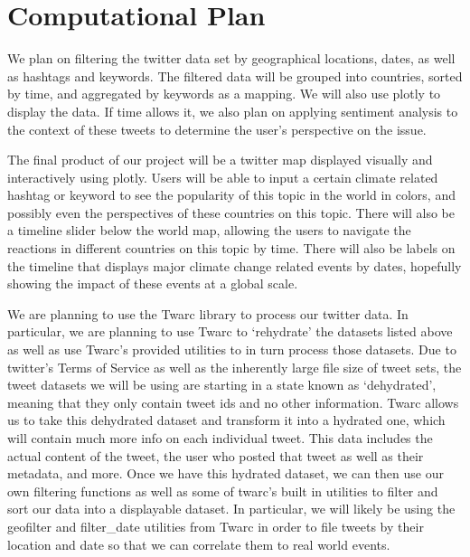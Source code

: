 \documentclass[fontsize=11pt]{article}
\begin{document}

\section*{Computational Plan}

\qquad We plan on filtering the twitter data set by geographical locations, dates, as well as hashtags and keywords. The filtered data will be grouped into countries, sorted by time, and aggregated by keywords as a mapping. We will also use plotly to display the data. If time allows it, we also plan on applying sentiment analysis to the context of these tweets to determine the user’s perspective on the issue. 

\vspace{0.5 cm}

The final product of our project will be a twitter map displayed visually and interactively using plotly. Users will be able to input a certain climate related hashtag or keyword to see the popularity of this topic in the world in colors, and possibly even the perspectives of these countries on this topic. There will also be a timeline slider below the world map, allowing the users to navigate the reactions in different countries on this topic by time. There will also be labels on the timeline that displays major climate change related events by dates, hopefully showing the impact of these events at a global scale. 

\vspace{0.5 cm}

We are planning to use the Twarc library to process our twitter data. In particular, we are planning to use Twarc to ‘rehydrate’ the datasets listed above as well as use Twarc’s provided utilities to in turn process those datasets. Due to twitter’s Terms of Service as well as the inherently large file size of tweet sets, the tweet datasets we will be using are starting in a state known as ‘dehydrated’, meaning that they only contain tweet ids and no other information. Twarc allows us to take this dehydrated dataset and transform it into a hydrated one, which will contain much more info on each individual tweet. This data includes the actual content of the tweet, the user who posted that tweet as well as their metadata, and more. Once we have this hydrated dataset, we can then use our own filtering functions as well as some of twarc’s built in utilities to filter and sort our data into a displayable dataset. In particular, we will likely be using the geofilter and filter\_date utilities from Twarc in order to file tweets by their location and date so that we can correlate them to real world events.
\end{document}
